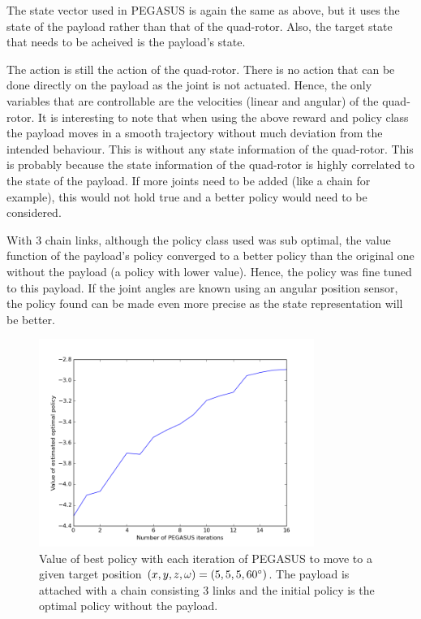 \documentclass[hidelinks,BTech]{iitmdiss}
\begin{document}
The state vector used in PEGASUS is again the same as above, but it uses the state of the payload rather than that of the quad-rotor. Also, the target state that needs to be acheived is the payload's state.

The action is still the action of the quad-rotor. There is no action that can be done directly on the payload as the joint is not actuated. Hence, the only variables that are controllable are the velocities (linear and angular) of the quad-rotor. It is interesting to note that when using the above reward and policy class the payload moves in a smooth trajectory without much deviation from the intended behaviour. This is without any state information of the quad-rotor. This is probably because the state information of the quad-rotor is highly correlated to the state of the payload. If more joints need to be added (like a chain for example), this would not hold true and a better policy would need to be considered.

With 3 chain links, although the policy class used was sub optimal, the value function of the payload's policy converged to a better policy than the original one without the payload (a policy with lower value). Hence, the policy was fine tuned to this payload. If the joint angles are known using an angular position sensor, the policy found can be made even more precise as the state representation will be better.

\begin{figure}[H]
  \centering
    \includegraphics[width=0.8\textwidth]{payload_position_control_time.png}
    \caption{Value of best policy with each iteration of PEGASUS to move to a given target position $(x, y, z, \omega) = (5, 5, 5, 60\protect^{\circ})$. The payload is attached with a chain consisting 3 links and the initial policy is the optimal policy without the payload.}
\end{figure}
\end{document}
